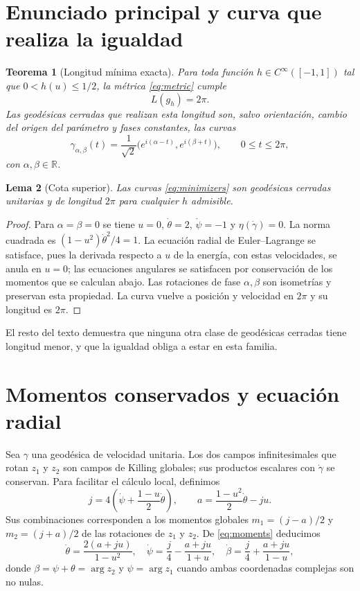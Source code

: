 \documentclass[11pt,a4paper]{article}
\newtheorem{theorem}{Teorema}[section]
\newtheorem{lemma}[theorem]{Lema}
\theoremstyle{remark}\newtheorem{remark}[theorem]{Observación}
\newcommand{\R}{\mathbb R}
\begin{document}
\section{Enunciado principal y curva que realiza la igualdad}
\begin{theorem}[Longitud mínima exacta]\label{thm:main}
Para toda función $h\in C^\infty([-1,1])$ tal que $0<h(u)\leq1/2$, la métrica \eqref{eq:metric} cumple
\[
\boxed{L(g_h)=2\pi.}
\]
Las geodésicas cerradas que realizan esta longitud son, salvo orientación, cambio del origen del parámetro y fases constantes, las curvas
\begin{equation}\label{eq:minimizers}
\gamma_{\alpha,\beta}(t)=\frac1{\sqrt2}\bigl(e^{i(\alpha-t)},e^{i(\beta+t)}\bigr),\qquad 0\leq t\leq2\pi,
\end{equation}
con $\alpha,\beta\in\R$.
\end{theorem}
\begin{lemma}[Cota superior]\label{lem:upper}
Las curvas \eqref{eq:minimizers} son geodésicas cerradas unitarias y de longitud $2\pi$ para cualquier $h$ admisible.
\end{lemma}
\begin{proof}
Para $\alpha=\beta=0$ se tiene $u=0$, $\dot\theta=2$, $\dot\psi=-1$ y $\eta(\dot\gamma)=0$. La norma cuadrada es $(1-u^2)\dot\theta^2/4=1$. La ecuación radial de Euler--Lagrange se satisface, pues la derivada respecto a $u$ de la energía, con estas velocidades, se anula en $u=0$; las ecuaciones angulares se satisfacen por conservación de los momentos que se calculan abajo. Las rotaciones de fase $\alpha,\beta$ son isometrías y preservan esta propiedad. La curva vuelve a posición y velocidad en $2\pi$ y su longitud es $2\pi$.
\end{proof}
El resto del texto demuestra que ninguna otra clase de geodésicas cerradas tiene longitud menor, y que la igualdad obliga a estar en esta familia.

\section{Momentos conservados y ecuación radial}
Sea $\gamma$ una geodésica de velocidad unitaria. Los dos campos infinitesimales que rotan $z_1$ y $z_2$ son campos de Killing globales; sus productos escalares con $\dot\gamma$ se conservan. Para facilitar el cálculo local, definimos
\begin{equation}\label{eq:moments}
j=4\left(\dot\psi+\frac{1-u}{2}\dot\theta\right),\qquad
a=\frac{1-u^2}{2}\dot\theta-ju.
\end{equation}
Sus combinaciones corresponden a los momentos globales $m_1=(j-a)/2$ y $m_2=(j+a)/2$ de las rotaciones de $z_1$ y $z_2$. De \eqref{eq:moments} deducimos
\begin{equation}\label{eq:angles}
\dot\theta=\frac{2(a+ju)}{1-u^2},\quad
\dot\psi=\frac j4-\frac{a+ju}{1+u},\quad
\dot\beta=\frac j4+\frac{a+ju}{1-u},
\end{equation}
donde $\beta=\psi+\theta=\arg z_2$ y $\psi=\arg z_1$ cuando ambas coordenadas complejas son no nulas.
\end{document}
